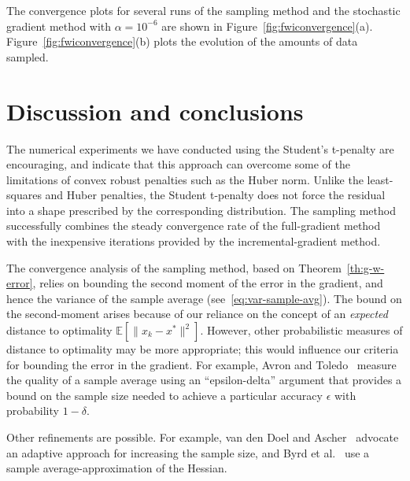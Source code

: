 \documentclass[nospthms]{svjour3}
\numberwithin{equation}{section}
\def\norm#1{\|#1\|}
\def\k{_k}
\def\xstar{x^*}
\def\expval{\mathbb{E}}
\begin{document}
The convergence plots for several runs of the sampling method and the
stochastic gradient method with $\alpha = 10^{-6}$ are shown in
Figure~\ref{fig:fwiconvergence}(a).
Figure~\ref{fig:fwiconvergence}(b) plots the evolution of the amounts
of data sampled.




\section{Discussion and conclusions}
\label{sec:disc-concl}

The numerical experiments we have conducted using the Student's t-penalty are
encouraging, and indicate that this approach can overcome some of the
limitations of convex robust penalties such as the Huber norm. Unlike the
least-squares and Huber penalties, the Student t-penalty does not
force the residual into a shape prescribed by the corresponding
distribution. The sampling method successfully combines the
steady convergence rate of the full-gradient method with the
inexpensive iterations provided by the incremental-gradient method.



The convergence analysis of the sampling method, based on
Theorem~\ref{th:g-w-error}, relies on bounding the second moment of
the error in the gradient, and hence the variance of the sample
average (see~\eqref{eq:var-sample-avg}). The bound on the
second-moment arises because of our reliance on the concept of an
\emph{expected} distance to optimality
$\expval[\norm{x\k-\xstar}^2]$. However, other probabilistic measures
of distance to optimality may be more appropriate; this would
influence our criteria for bounding the error in the gradient. For
example, Avron and Toledo~\cite{AvronToledo:2011} measure the quality
of a sample average using an ``epsilon-delta'' argument that provides
a bound on the sample size needed to achieve a particular accuracy
$\epsilon$ with probability $1-\delta$.

Other refinements are possible. For example, van den Doel and
Ascher~\cite{AschervdDoel:2011} advocate an adaptive approach for
increasing the sample size, and Byrd et al.~\cite{byrd:2011} use a
sample average-approximation of the
Hessian.



\end{document}
